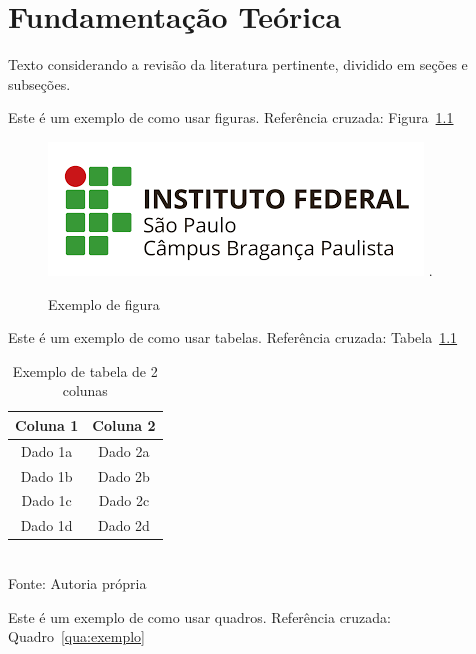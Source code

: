 \chapter{Fundamentação Teórica}
\label{cap:02}

Texto considerando a revisão da literatura pertinente, dividido em seções e subseções.

Este é um exemplo de como usar figuras. Referência cruzada: Figura~\ref{fig:exemplo}

\FloatBarrier
\begin{figure}[!htbp]
	\centering
	\caption{Exemplo de figura}
	\includegraphics[scale=1]{imagens/IFSP-BRA.png}
	.
	\label{fig:exemplo}
\end{figure}
\FloatBarrier


Este é um exemplo de como usar tabelas. Referência cruzada: Tabela~\ref{tab:exemplo}

\FloatBarrier
\begin{table}[!htbp]
\centering
\caption{Exemplo de tabela de 2 colunas}
	\begin{tabular}{ c | c }
		\hline
		\textbf{Coluna 1} & \textbf{Coluna 2} \\ \hline
		Dado 1a           & Dado 2a           \\ \hline
		Dado 1b           & Dado 2b           \\ \hline
		Dado 1c           & Dado 2c           \\ \hline
		Dado 1d           & Dado 2d           \\ \hline
	\end{tabular}
	\\ \vspace{0.2cm}
	Fonte: Autoria própria
	\label{tab:exemplo}
\end{table}
\FloatBarrier


Este é um exemplo de como usar quadros. Referência cruzada: Quadro~\ref{qua:exemplo}


